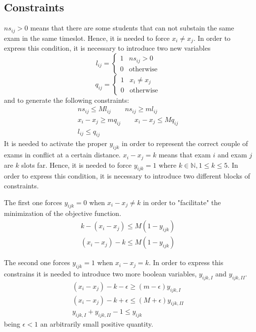 \subsection*{Constraints}
$ ns_{ij} > 0 $ means that there are some students that can not substain the same exam in the same timeslot. Hence, it is needed to force $ x_{i} \ne x_{j} $.
In order to express this condition, it is necessary to introduce two new variables
\[
l_{ij} = 
\begin{cases}
1	&	ns_{ij} > 0	\\
0	&	\text{otherwise}
\end{cases}
\]
\[
q_{ij} = 
\begin{cases}
1	&	x_{i} \ne x_{j}	\\
0	&	\text{otherwise}
\end{cases}
\]
and to generate the following constraints:
\begin{gather*}
ns_{ij} \le M l_{ij} \qquad ns_{ij} \ge m l_{ij} \\
x_{i} - x_{j} \ge m q_{ij} \qquad x_{i} - x_{j} \le M q_{ij} \\
l_{ij} \le q_{ij}
\end{gather*}
\newline
It is needed to activate the proper $ y_{ijk} $ in order to represent the correct couple of exams in conflict at a certain distance.
\newline
$ x_{i} - x_{j} = k $ means that exam $i$ and exam $j$ are $k$ slots far. Hence, it is needed to force $ y_{ijk} = 1 $ where $ k \in \mathbb{N}, 1 \le k \le 5 $.
In order to express this condition, it is necessary to introduce two different blocks of constraints.

The first one forces $ y_{ijk} = 0 $ when $ x_{i} - x_{j} \ne k $ in order to "facilitate" the minimization of the objective function.
\begin{gather*}
k - (x_{i} - x_{j}) \le M (1-y_{ijk}) \\
(x_{i} - x_{j}) - k \le M (1-y_{ijk})
\end{gather*}

The second one forces $ y_{ijk} = 1 $ when $ x_{i} - x_{j} = k $.
In order to express this constrains it is needed to introduce two more boolean variables, $ y_{ijk, I} $ and $ y_{ijk, II} $.
\begin{gather}
\label{eqn:1}
(x_{i} - x_{j}) - k - \epsilon \ge (m - \epsilon) y_{ijk, I} \\
\label{eqn:2}
(x_{i} - x_{j}) - k + \epsilon \le (M + \epsilon) y_{ijk, II} \\
\label{eqn:3}
y_{ijk, I} + y_{ijk, II} - 1 \le y_{ijk}
\end{gather}
being $ \epsilon < 1 $ an arbitrarily small positive quantity.

